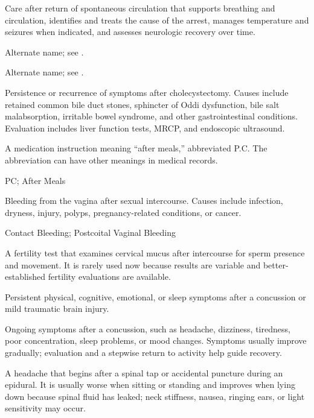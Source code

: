  Care after return of spontaneous circulation that supports breathing and circulation, identifies and treats the cause of
the arrest, manages temperature and seizures when indicated, and assesses neurologic
recovery over time.

 Alternate name; see .

 Alternate name; see .

 Persistence or recurrence of symptoms after cholecystectomy. Causes include retained
common bile duct stones, sphincter of Oddi dysfunction, bile salt malabsorption,
irritable bowel syndrome, and other gastrointestinal conditions. Evaluation includes
liver function tests, MRCP, and endoscopic ultrasound.

 A medication instruction meaning ``after meals,'' abbreviated P.C. The abbreviation can have other meanings in medical records.

\synonyms
PC; After Meals

 Bleeding from the vagina after sexual intercourse. Causes include infection, dryness, injury, polyps, pregnancy-related conditions, or cancer.

\synonyms
Contact Bleeding; Postcoital Vaginal Bleeding

 A fertility test that examines cervical mucus after intercourse for sperm presence and movement. It is rarely used now because results are variable and better-established fertility evaluations are available.

 Persistent physical, cognitive, emotional, or sleep symptoms after a concussion or mild traumatic brain injury.

 Ongoing symptoms after a concussion, such as headache, dizziness, tiredness, poor concentration, sleep problems, or mood changes. Symptoms usually improve gradually; evaluation and a stepwise return to activity help guide recovery.

 A headache that begins after a spinal tap or accidental puncture during an epidural. It is usually worse when sitting or standing and improves when lying down because spinal fluid has leaked; neck stiffness, nausea, ringing ears, or light sensitivity may occur.

